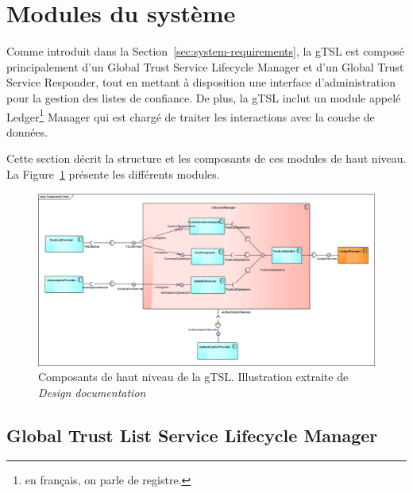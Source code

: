 \documentclass{tnreport}
\begin{document}
\section{Modules du système}
\label{sec:modules}

Comme introduit dans la Section~\ref{sec:system-requirements}, la gTSL est composé principalement d'un
Global Trust Service Lifecycle Manager et d'un Global Trust Service Responder, tout en mettant à disposition une interface d'administration pour la gestion des listes de confiance.
De plus, la gTSL inclut un module appelé Ledger\footnote{en français, on parle de registre.} Manager qui est chargé de traiter les interactions avec la couche de données.

Cette section décrit la structure et les composants de ces modules de haut niveau. La Figure~\ref{fig:highlevel-components} présente les différents modules.

\begin{figure}[h]
	\centering
	\includegraphics[scale=0.38]{figures/highlevel-components}
	\caption{Composants de haut niveau de la gTSL. Illustration extraite de \textit{Design documentation}~\cite{design-document}}
	\label{fig:highlevel-components}
\end{figure}

\subsection{Global Trust List Service Lifecycle Manager}
\end{document}
